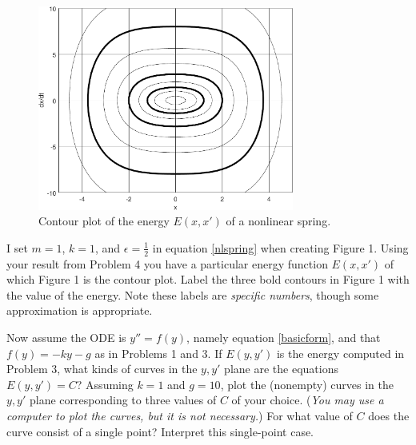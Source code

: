 \documentclass[12pt]{article}
\theoremstyle{definition}
\newcommand{\eps}{\epsilon}
\begin{document}
\begin{figure}[h]
\begin{center}
\includegraphics[width=0.75\textwidth]{figs/nlspringcurves.pdf}
\end{center}

\vspace{-5mm}
\caption{Contour plot of the energy $E(x,x')$ of a nonlinear spring.}
\end{figure}

\begin{prob}
I set $m=1$, $k=1$, and $\eps=\frac{1}{2}$ in equation \eqref{nlspring} when creating Figure 1.  Using your result from Problem 4 you have a particular energy function $E(x,x')$ of which Figure 1 is the contour plot.  Label the three bold contours in Figure 1 with the value of the energy.  Note these labels are \emph{specific numbers}, though some approximation is appropriate.
\end{prob}

\begin{prob}
Now assume the ODE is $y''=f(y)$, namely equation \eqref{basicform}, and that $f(y)=-ky-g$ as in Problems 1 and 3.  If $E(y,y')$ is the energy computed in Problem 3, what kinds of curves in the $y,y'$ plane are the equations $E(y,y')=C$?  Assuming $k=1$ and $g=10$, plot the (nonempty) curves in the $y,y'$ plane corresponding to three values of $C$ of your choice.  (\emph{You may use a computer to plot the curves, but it is not necessary.})  For what value of $C$ does the curve consist of a single point?  Interpret this single-point case.
\end{prob}
\end{document}
